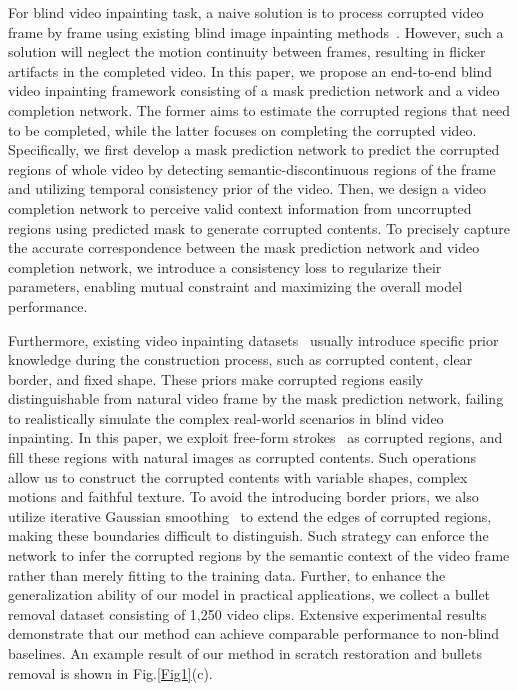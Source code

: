 For blind video inpainting task, a naive solution is to process corrupted video frame by frame using existing blind image inpainting methods~\cite{schmalfuss2022blind,wang2020vcnet,10147235}. 
However, such a solution will neglect the motion continuity between frames, resulting in flicker artifacts in the completed video.
In this paper, we propose an end-to-end blind video inpainting framework consisting of a mask prediction network and a video completion network.
The former aims to estimate the corrupted regions that need to be completed, while the latter focuses on completing the corrupted video.
Specifically, we first develop a mask prediction network to predict the corrupted regions of whole video by detecting semantic-discontinuous regions of the frame and utilizing temporal consistency prior of the video.
Then, we design a video completion network to perceive valid context information from uncorrupted regions using predicted mask to generate corrupted contents.
To precisely capture the accurate correspondence between the mask prediction network and video completion network, we introduce a consistency loss to regularize their parameters, enabling mutual constraint and maximizing the overall model performance.

Furthermore, existing video inpainting datasets~\cite{lee2019cpnet,chang2019free,yan2020sttn,Kang2022ErrorCF} usually introduce specific prior knowledge during the construction process, such as corrupted content, clear border, and fixed shape.
These priors make corrupted regions easily distinguishable from natural video frame by the mask prediction network, failing to realistically simulate the complex real-world scenarios in blind video inpainting.
In this paper, we exploit free-form strokes~\cite{chang2019free} as corrupted regions, and fill these regions with natural images as corrupted contents. 
Such operations allow us to construct the corrupted contents with variable shapes, complex motions and faithful texture.
To avoid the introducing border priors, we also utilize iterative Gaussian smoothing~\cite{wang2018image} to extend the edges of corrupted regions, making these boundaries difficult to distinguish.
Such strategy can enforce the network to infer the corrupted regions by the semantic context of the video frame rather than merely fitting to the training data.
Further, to enhance the generalization ability of our model in practical applications, we collect a bullet removal dataset consisting of 1,250 video clips. 
Extensive experimental results demonstrate that our method can achieve comparable performance to non-blind baselines. 
An example result of our method in scratch restoration and bullets removal is shown in Fig.\ref{Fig1}(c).


